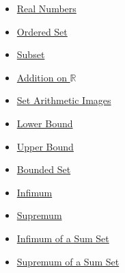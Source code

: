 \begin{dependencies}
\begin{itemize}
  \item \hyperref[def:reals]{Real Numbers}
  \item \hyperref[def:ordered-set]{Ordered Set}
  \item \hyperref[def:subset]{Subset}
  \item \hyperref[def:addition-on-r]{Addition on $\mathbb{R}$}
  \item \hyperref[def:set-arithmetic-images]{Set Arithmetic Images}
  \item \hyperref[def:real-lower-bound]{Lower Bound}
  \item \hyperref[def:real-upper-bound]{Upper Bound}
  \item \hyperref[def:bounded]{Bounded Set}
  \item \hyperref[def:infimum]{Infimum}
  \item \hyperref[def:supremum]{Supremum}
  \item \hyperref[thm:infimum-sum-set]{Infimum of a Sum Set}
  \item \hyperref[thm:supremum-sum-set]{Supremum of a Sum Set}
\end{itemize}
\end{dependencies}





